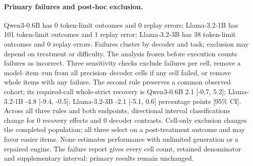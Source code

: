 \paragraph{Primary failures and post-hoc exclusion.} Qwen3-0.6B has 0 token-limit outcomes and 0 replay errors; Llama-3.2-1B has 101 token-limit outcomes and 1 replay error; Llama-3.2-3B has 38 token-limit outcomes and 0 replay errors. Failures cluster by decoder and task; exclusion may depend on treatment or difficulty. The analysis frozen before execution counts failures as incorrect. Three sensitivity checks exclude failures per cell, remove a model--item--run from all precision--decoder cells if any cell failed, or remove whole items with any failure. The second rule preserves a common observed cohort; its required-call whole-strict recovery is Qwen3-0.6B 2.1 [-0.7, 5.2]; Llama-3.2-1B -4.8 [-9.4, -0.5]; Llama-3.2-3B -2.1 [-5.1, 0.6] percentage points [95\% CI]. Across all three rules and both endpoints, directional interval classifications change for 0 recovery effects and 0 decoder contrasts. Cell-only exclusion changes the completed population; all three select on a post-treatment outcome and may favor easier items. None estimates performance with unlimited generation or a repaired engine. The failure report gives every cell count, retained denominator and supplementary interval; primary results remain unchanged.
